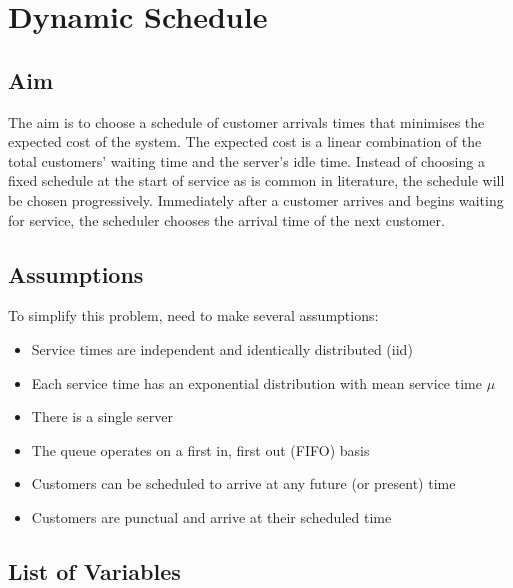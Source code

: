 \chapter{Dynamic Schedule}

\section{Aim}

The aim is to choose a schedule of customer arrivals times that minimises the expected cost of the system. The expected cost is a linear combination of the total customers' waiting time and the server's idle time. Instead of choosing a fixed schedule at the start of service as is common in literature, the schedule will be chosen progressively. Immediately after a customer arrives and begins waiting for service, the scheduler chooses the arrival time of the next customer.

\section{Assumptions}

To simplify this problem, need to make several assumptions:
\begin{itemize}[nosep]
	\item Service times are independent and identically distributed (iid)
	\item Each service time has an exponential distribution with mean service time $\mu$
	\item There is a single server
	\item The queue operates on a first in, first out (FIFO) basis
	\item Customers can be scheduled to arrive at any future (or present) time
	\item Customers are punctual and arrive at their scheduled time
\end{itemize}

\section{List of Variables}

